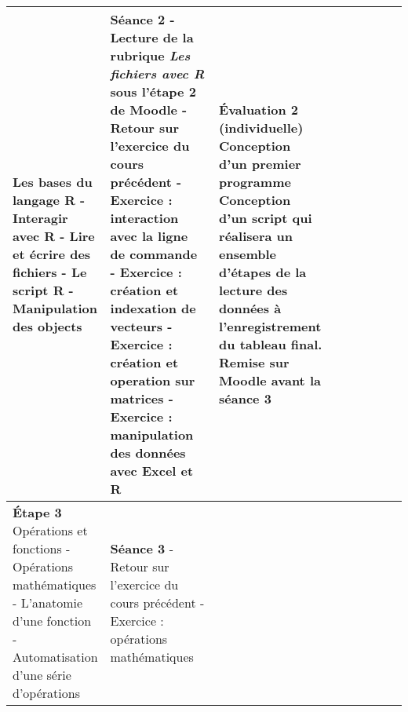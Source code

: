 \documentclass[12]{article}
\begin{document}
\begin{center}
\begin{tabular}{| p{0.1\linewidth} | p{0.3\linewidth} | p{0.3\linewidth} | p{0.3\linewidth} | }
        Les bases du langage R\hfill\hfill \linebreak\linebreak 
            - Interagir avec R\hfill\hfill \linebreak
            - Lire et écrire des fichiers\hfill\hfill \linebreak
            - Le script R\hfill\hfill \linebreak
            - Manipulation des objects\hfill\hfill &
        \textbf{Séance 2} \linebreak
        - Lecture de la rubrique \textit{Les fichiers avec R} sous l'étape 2 de Moodle\hfill\hfill \linebreak
        - Retour sur l'exercice du cours précédent\hfill\hfill \linebreak
        - Exercice : interaction avec la ligne de commande\hfill\hfill \linebreak
        - Exercice : création et indexation de vecteurs\hfill\hfill \linebreak
        - Exercice : création et operation sur matrices\hfill\hfill \linebreak
        - Exercice : manipulation des données avec Excel et R\hfill\hfill &
        \textbf{Évaluation 2} (individuelle) \linebreak
        \textbf{Conception d'un premier programme}\hfill\hfill \linebreak
        Conception d'un script qui réalisera un ensemble d'étapes de la lecture
        des données à l'enregistrement du tableau final. Remise sur Moodle
        avant la séance 3\hfill\hfill\hfill \\
        \hline
        \textbf{Étape 3}
        Opérations et fonctions\hfill\hfill \linebreak\linebreak 
            - Opérations mathématiques\hfill\hfill \linebreak
            - L'anatomie d'une fonction\hfill\hfill \linebreak
            - Automatisation d'une série d'opérations\hfill &
        \textbf{Séance 3} \linebreak
        - Retour sur l'exercice du cours précédent\hfill\hfill \linebreak
        - Exercice : opérations mathématiques\hfill\hfill & 

\end{tabular}
\end{center}
\end{document}
